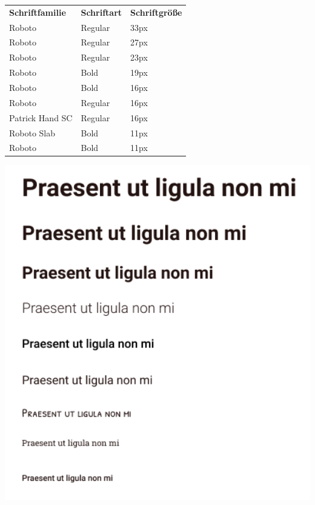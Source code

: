 \begin{minipage}{.7\textwidth}
    \begin{tabular}{ l l l }
        \textbf{Schriftfamilie} & \textbf{Schriftart} & \textbf{Schriftgröße} \\ 
        Roboto & Regular & 33px \\  
        Roboto & Regular & 27px \\
        Roboto & Regular & 23px \\
        Roboto & Bold & 19px \\
        Roboto & Bold & 16px \\
        Roboto & Regular & 16px \\
        Patrick Hand SC & Regular & 16px \\
        Roboto Slab & Bold & 11px \\
        Roboto & Bold & 11px \\
    \end{tabular}
\end{minipage}
\begin{minipage}{.3\textwidth}
    \includegraphics[width=1\textwidth]{images/typographie.png}
    \label{fig:styleguide-typographie}
\end{minipage}

